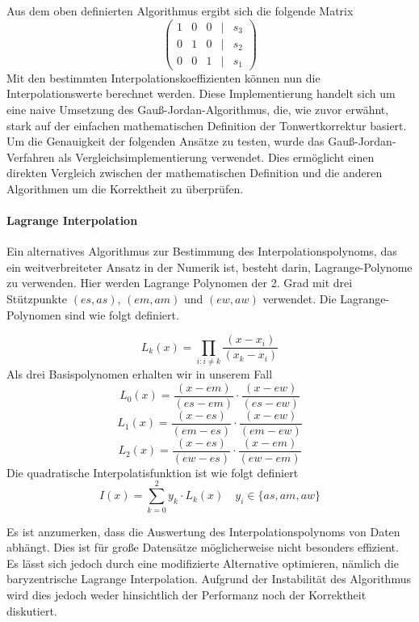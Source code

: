 \documentclass[course=erap]{aspdoc}
\begin{document}
Aus dem oben definierten Algorithmus ergibt sich die folgende Matrix
\[
\left(\begin{matrix}
1 & 0 & 0 & | & s_3 \\
0 & 1 & 0 & | & s_2  \\
0 & 0 & 1 & | & s_1
\end{matrix}\right)
\]
Mit den bestimmten Interpolationskoeffizienten können nun die Interpolationswerte berechnet werden.
Diese Implementierung handelt sich um eine naive Umsetzung des Gauß-Jordan-Algorithmus, die, wie zuvor erwähnt, stark auf der einfachen mathematischen Definition der Tonwertkorrektur basiert.
Um die Genauigkeit der folgenden Ansätze zu testen, wurde das Gauß-Jordan-Verfahren als Vergleichsimplementierung verwendet. Dies ermöglicht einen direkten Vergleich zwischen der mathematischen Definition und die anderen Algorithmen um die Korrektheit zu überprüfen.


\paragraph{Lagrange Interpolation}
Ein alternatives Algorithmus zur Bestimmung des Interpolationspolynoms, das  ein  weitverbreiteter Ansatz in der Numerik ist, besteht darin, Lagrange-Polynome zu verwenden. Hier werden Lagrange Polynomen 
der 2. Grad mit drei Stützpunkte  $(es, as)$, $(em, am)$ und $(ew, aw)$ verwendet. Die Lagrange-Polynomen sind wie folgt definiert.

\[
L_k(x) =\prod_{i:i \neq k}  \frac{(x - x_i)}{(x_k - x_i)}
\]
Als drei Basispolynomen erhalten wir in unserem Fall
\[
L_0(x) =\frac{(x - em)}{(es - em)} \cdot  \frac{(x- ew)}{(es - ew)}
\]
\[
L_1(x) =\frac{(x - es)}{(em - es)} \cdot  \frac{(x - ew)}{(em - ew)}
\]
\[
L_2(x) =\frac{(x - es)}{(ew - es)} \cdot  \frac{(x - em)}{(ew - em)}
\]
Die quadratische Interpolatisfunktion ist wie folgt definiert
\[
I(x) = \sum_{k=0}^{2} y_k \cdot L_k(x) \quad  y_i \in \{as, am, aw\}
\]

Es ist anzumerken, dass die Auswertung des Interpolationspolynoms von Daten abhängt. Dies ist für große Datensätze möglicherweise nicht besonders effizient. Es lässt sich jedoch durch eine modifizierte Alternative optimieren, nämlich die baryzentrische Lagrange Interpolation. Aufgrund der Instabilität  des Algorithmus \cite{BLagrange} wird dies jedoch weder hinsichtlich der Performanz noch der Korrektheit diskutiert.
\end{document}
